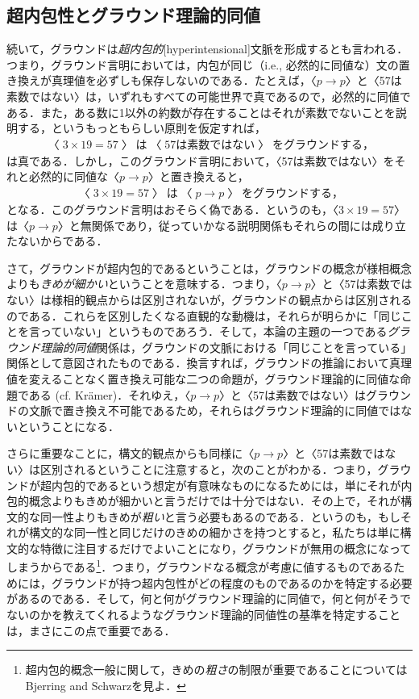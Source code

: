 \documentclass[twoside,14Q,dvipdfmx]{jsarticle}
\theoremstyle{definition}
\begin{document}
\subsection{超内包性とグラウンド理論的同値}\label{hyperintensional}
続いて，グラウンドは\emph{超内包的}[hyperintensional]文脈を形成するとも言われる．つまり，グラウンド言明においては，内包が同じ（i.e., 必然的に同値な）文の置き換えが真理値を必ずしも保存しないのである．たとえば，〈$p\rightarrow p$〉と〈57は素数ではない〉は，いずれもすべての可能世界で真であるので，必然的に同値である．また，ある数に1以外の約数が存在することはそれが素数でないことを説明する，というもっともらしい原則を仮定すれば，
	\begin{align*}
	〈3\times 19=57〉は〈57は素数ではない〉をグラウンドする，
	\end{align*}
は真である．しかし，このグラウンド言明において，〈57は素数ではない〉をそれと必然的に同値な〈$p\rightarrow p$〉と置き換えると，
	\begin{align*}
	〈3\times 19=57〉は〈p\rightarrow p〉をグラウンドする，
	\end{align*}
となる．このグラウンド言明はおそらく偽である．というのも，〈$3\times 19=57$〉は〈$p\rightarrow p$〉と無関係であり，従っていかなる説明関係もそれらの間には成り立たないからである．

さて，グラウンドが超内包的であるということは，グラウンドの概念が様相概念よりも\emph{きめが細かい}ということを意味する．つまり，〈$p\rightarrow p$〉と〈57は素数ではない〉は様相的観点からは区別されないが，グラウンドの観点からは区別されるのである．これらを区別したくなる直観的な動機は，それらが明らかに「同じことを言っていない」というものであろう．そして，本論の主題の一つである\emph{グラウンド理論的同値}関係は，グラウンドの文脈における「同じことを言っている」関係として意図されたものである．換言すれば，グラウンドの推論において真理値を変えることなく置き換え可能な二つの命題が，グラウンド理論的に同値な命題である (cf. Kr\"{a}mer\cite{Kramer2018,Kramer2021})．それゆえ，〈$p\rightarrow p$〉と〈57は素数ではない〉はグラウンドの文脈で置き換え不可能であるため，それらはグラウンド理論的に同値ではないということになる．

さらに重要なことに，構文的観点からも同様に〈$p\rightarrow p$〉と〈57は素数ではない〉は区別されるということに注意すると，次のことがわかる．つまり，グラウンドが超内包的であるという想定が有意味なものになるためには，単にそれが内包的概念よりもきめが細かいと言うだけでは十分ではない．その上で，それが構文的な同一性よりもきめが\emph{粗い}と言う必要もあるのである．というのも，もしそれが構文的な同一性と同じだけのきめの細かさを持つとすると，私たちは単に構文的な特徴に注目するだけでよいことになり，グラウンドが無用の概念になってしまうからである\footnote{超内包的概念一般に関して，きめの\emph{粗さ}の制限が重要であることについてはBjerring and Schwarz\cite{BjerringandSchwarz2017}を見よ．}．つまり，グラウンドなる概念が考慮に値するものであるためには，グラウンドが持つ超内包性がどの程度のものであるのかを特定する必要があるのである．そして，何と何がグラウンド理論的に同値で，何と何がそうでないのかを教えてくれるようなグラウンド理論的同値性の基準を特定することは，まさにこの点で重要である．
%
%
%
\end{document}
